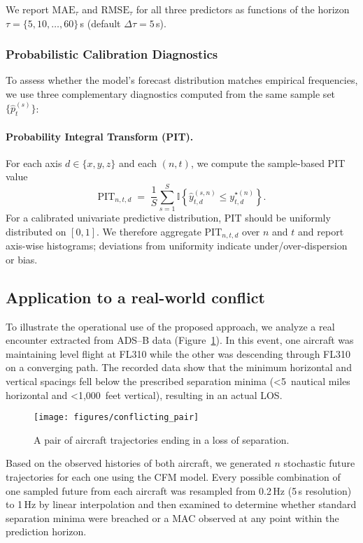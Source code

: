 \documentclass[
  manuscript=proceedings,  %
  layout=preprint,  %
  year=20xx,
  volume=x,
]{extra/joas}
\begin{document}
We report $\mathrm{MAE}_\tau$ and $\mathrm{RMSE}_\tau$ for all three predictors as functions of the horizon $\tau = \{5,10,\ldots,60\}$\,s (default $\Delta \tau{=}5$\,s).
\subsubsection{Probabilistic Calibration Diagnostics}
\label{subsubsec:calibration}

To assess whether the model’s forecast distribution matches empirical frequencies, we use three complementary diagnostics computed from the same sample set $\{\hat{p}^{(s)}_t\}$:

\paragraph{Probability Integral Transform (PIT).}
For each axis $d\in\{x,y,z\}$ and each $(n,t)$, we compute the sample-based PIT value
\[
\mathrm{PIT}_{n,t,d} \;=\; \frac{1}{S}\sum_{s=1}^S \mathbb{I}\!\left\{ \hat{y}^{(s,n)}_{t,d} \le y^{\star(n)}_{t,d} \right\}.
\]
For a calibrated univariate predictive distribution, $\mathrm{PIT}$ should be uniformly distributed on $[0,1]$. We therefore aggregate $\mathrm{PIT}_{n,t,d}$ over $n$ and $t$ and report axis-wise histograms; deviations from uniformity indicate under/over-dispersion or bias.

\subsection{Application to a real-world conflict}

To illustrate the operational use of the proposed approach, we analyze a real encounter extracted from ADS--B data (Figure~\ref{fig:conflicting_pair}). 
In this event, one aircraft was maintaining level flight at FL310 while the other was descending through FL310 on a converging path. 
The recorded data show that the minimum horizontal and vertical spacings fell below the prescribed separation minima (<5~nautical miles horizontal and <1,000~feet vertical), resulting in an actual LOS.

\begin{figure}[hbt]
    \centering
    \texttt{[image: figures/conflicting\_pair]}
    \caption{A pair of aircraft trajectories ending in a loss of separation.}
    \label{fig:conflicting_pair}
\end{figure}

Based on the observed histories of both aircraft, we generated $n$ stochastic future trajectories for each one using the CFM model. 
Every possible combination of one sampled future from each aircraft was resampled from 0.2\,Hz (5\,s resolution) to 1\,Hz by linear interpolation and then examined to determine whether standard separation minima were breached or a MAC observed at any point within the prediction horizon.
\end{document}

